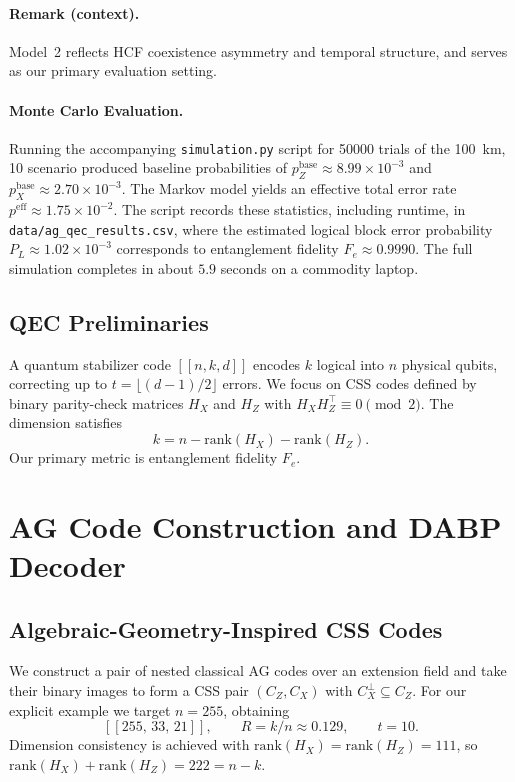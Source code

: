 \documentclass[conference]{IEEEtran}
\begin{document}
\paragraph*{Remark (context).}
Model~2 reflects HCF coexistence asymmetry and temporal structure, and serves as our primary evaluation setting.

\paragraph*{Monte Carlo Evaluation.} Running the accompanying \texttt{simulation.py} script for \SI{50 000}{} trials of the \SI{100}{\kilo\meter}, \SI{10}{\dBm} scenario produced baseline probabilities of $p_Z^{\mathrm{base}}\approx8.99\times10^{-3}$ and $p_X^{\mathrm{base}}\approx2.70\times10^{-3}$. The Markov model yields an effective total error rate $p^{\mathrm{eff}}\approx1.75\times10^{-2}$. The script records these statistics, including runtime, in \texttt{data/ag\_qec\_results.csv}, where the estimated logical block error probability $P_L\approx1.02\times10^{-3}$ corresponds to entanglement fidelity $F_e\approx0.9990$. The full simulation completes in about $5.9$ seconds on a commodity laptop.

\subsection{QEC Preliminaries}
A quantum stabilizer code \( [[n,k,d]] \) encodes \(k\) logical into \(n\) physical qubits, correcting up to \(t=\lfloor(d-1)/2\rfloor\) errors. We focus on CSS codes defined by binary parity-check matrices \(H_X\) and \(H_Z\) with \(H_X H_Z^\top\equiv 0 \pmod{2}\). The dimension satisfies
\begin{equation}
k = n - \mathrm{rank}(H_X) - \mathrm{rank}(H_Z).
\end{equation}
Our primary metric is entanglement fidelity \(F_e\).

\section{AG Code Construction and DABP Decoder}\label{sec:code_decoder}

\subsection{Algebraic-Geometry-Inspired CSS Codes}
We construct a pair of nested classical AG codes over an extension field and take their binary images to form a CSS pair \((C_Z,C_X)\) with \(C_X^\perp \subseteq C_Z\). For our explicit example we target \(n=255\), obtaining
\[
  [[255,\,33,\,21]] ,\qquad R=k/n\approx 0.129,\qquad t=10.
\]
Dimension consistency is achieved with \(\mathrm{rank}(H_X)=\mathrm{rank}(H_Z)=111\), so \(\mathrm{rank}(H_X)+\mathrm{rank}(H_Z)=222=n-k\).
\end{document}
